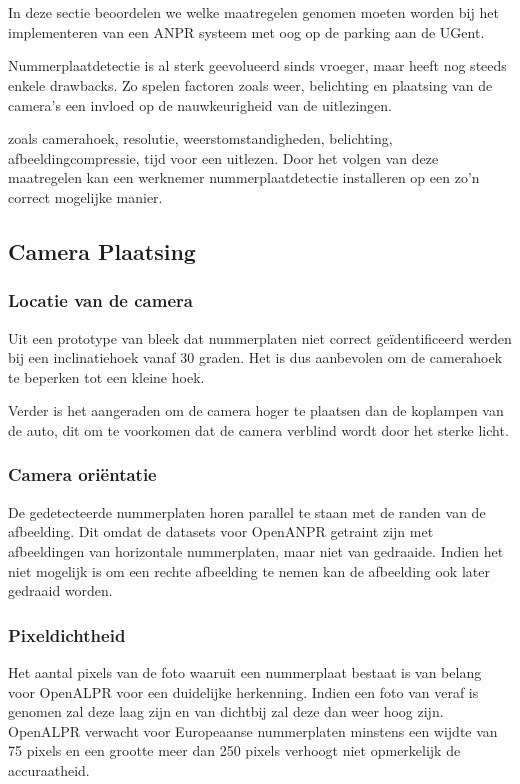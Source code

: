 
\chapter{}
\label{ch:maatregelenanpr}

In deze sectie beoordelen we welke maatregelen genomen moeten worden bij het implementeren van een ANPR systeem met oog op de parking aan de UGent.

Nummerplaatdetectie is al sterk geevolueerd sinds vroeger, maar heeft nog steeds enkele drawbacks. Zo spelen factoren zoals weer, belichting en plaatsing van de camera's een invloed op de nauwkeurigheid van de uitlezingen.

zoals camerahoek, resolutie, weerstomstandigheden, belichting, afbeeldingcompressie, tijd voor een uitlezen. Door het volgen van deze maatregelen kan een werknemer nummerplaatdetectie installeren op een zo'n correct mogelijke manier.

\section{Camera Plaatsing}

\subsection{Locatie van de camera}
Uit een prototype van \textcite{arrieta2019prototype} bleek dat nummerplaten niet correct geïdentificeerd werden bij een inclinatiehoek vanaf 30 graden. Het is dus aanbevolen om de camerahoek te beperken tot een kleine hoek.

Verder is het aangeraden om de camera hoger te plaatsen dan de koplampen van de auto, dit om te voorkomen dat de camera verblind wordt door het sterke licht.

\subsection{Camera oriëntatie}
De gedetecteerde nummerplaten horen parallel te staan met de randen van de afbeelding. Dit omdat de datasets voor OpenANPR getraint zijn met afbeeldingen van horizontale nummerplaten, maar niet van gedraaide. Indien het niet mogelijk is om een rechte afbeelding te nemen kan de afbeelding ook later gedraaid worden.

\subsection{Pixeldichtheid}
Het aantal pixels van de foto waaruit een nummerplaat bestaat is van belang voor OpenALPR voor een duidelijke herkenning. Indien een foto van veraf is genomen zal deze laag zijn en van dichtbij zal deze dan weer hoog zijn. OpenALPR verwacht voor Europeaanse nummerplaten minstens een wijdte van 75 pixels en een grootte meer dan 250 pixels verhoogt niet opmerkelijk de accuraatheid. \autocite{openalprcameraplacement}

